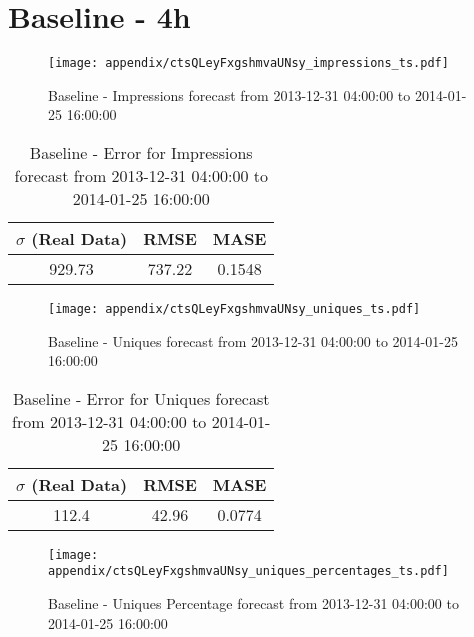 \section{Baseline - 4h}
\begin{figure}[H] \begin{center} \leavevmode
\texttt{[image: appendix/ctsQLeyFxgshmvaUNsy\_impressions\_ts.pdf]} \caption{
Baseline - Impressions forecast from 2013-12-31 04:00:00 to 2014-01-25 16:00:00} \label{fig:appendix/ctsQLeyFxgshmvaUNsy_impressions_ts.pdf} \end{center}
\end{figure}

\begin{table}[H]
\centering
\footnotesize
\begin{tabular}{ccc}
$\sigma$ (Real Data) & RMSE & MASE   \\ \hline
929.73 & 737.22 & 0.1548 \\
\end{tabular}

\vspace{0.5cm}

\caption{
Baseline - Error for Impressions forecast from 2013-12-31 04:00:00 to 2014-01-25 16:00:00}
\end{table}

\begin{figure}[H] \begin{center} \leavevmode
\texttt{[image: appendix/ctsQLeyFxgshmvaUNsy\_uniques\_ts.pdf]} \caption{
Baseline - Uniques forecast from 2013-12-31 04:00:00 to 2014-01-25 16:00:00} \label{fig:appendix/ctsQLeyFxgshmvaUNsy_uniques_ts.pdf} \end{center}
\end{figure}

\begin{table}[H]
\centering
\footnotesize
\begin{tabular}{ccc}
$\sigma$ (Real Data) & RMSE & MASE   \\ \hline
112.4 & 42.96 & 0.0774 \\
\end{tabular}

\vspace{0.5cm}

\caption{
Baseline - Error for Uniques forecast from 2013-12-31 04:00:00 to 2014-01-25 16:00:00}
\end{table}

\begin{figure}[H] \begin{center} \leavevmode
\texttt{[image: appendix/ctsQLeyFxgshmvaUNsy\_uniques\_percentages\_ts.pdf]} \caption{
Baseline - Uniques Percentage forecast from 2013-12-31 04:00:00 to 2014-01-25 16:00:00} \label{fig:appendix/ctsQLeyFxgshmvaUNsy_uniques_percentages_ts.pdf} \end{center}
\end{figure}

